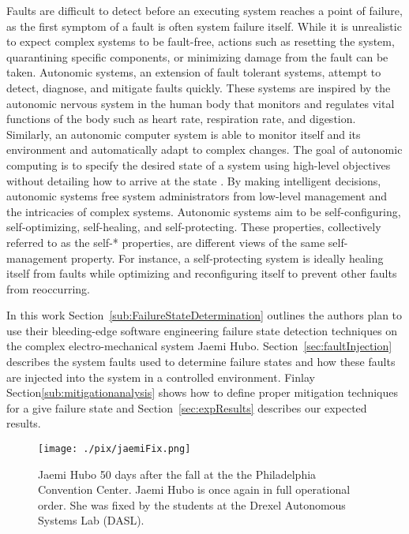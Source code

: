 Faults are difficult to detect before an executing system reaches a point of
failure, as the first symptom of a fault is often system failure itself. While
it is unrealistic to expect complex systems to be fault-free, actions such as
resetting the system, quarantining specific components, or minimizing damage
from the fault can be taken. Autonomic systems, an extension of fault tolerant
systems, attempt to detect, diagnose, and mitigate faults quickly. These
systems are inspired by the autonomic nervous system in the human body that
monitors and regulates vital functions of the body such as heart rate,
respiration rate, and digestion. Similarly, an autonomic computer system is
able to monitor itself and its environment and automatically adapt to complex
changes. The goal of autonomic computing is to specify the desired state of a
system using high-level objectives without detailing how to arrive at the state
\cite{1160055,4061119,1301340}. By making intelligent decisions, autonomic
systems free system administrators from low-level management and the
intricacies of complex systems. Autonomic systems aim to be self-configuring,
self-optimizing, self-healing, and self-protecting. These properties,
collectively referred to as the self-* properties, are different views of the
same self-man\-age\-ment property. For instance, a self-protecting system is
ideally healing itself from faults while optimizing and reconfiguring itself to
prevent other faults from reoccurring.


In this work Section~\ref{sub:FailureStateDetermination} outlines the authors
plan to use their bleeding-edge software engineering failure state detection
techniques on the complex electro-mechanical system Jaemi Hubo.
Section~\ref{sec:faultInjection} describes the system faults used to determine failure
states and how these faults are injected into the system in a controlled environment.  Finlay
Section\ref{sub:mitigationanalysis} shows how to define proper mitigation
techniques for a give failure state and Section~\ref{sec:expResults} describes
our expected results.

\begin{figure}[thpb]
  \centering
\texttt{[image: ./pix/jaemiFix.png]}
  \caption{Jaemi Hubo 50 days after the fall at the the Philadelphia Convention Center.  
  Jaemi Hubo is once again in full operational order.  She was fixed by the students at 
  the Drexel Autonomous Systems Lab (DASL).
	}
  \label{fig:huboFix}
\end{figure}